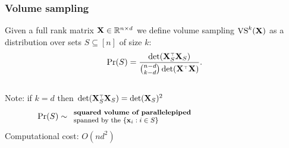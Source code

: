 \documentclass{beamer}
\begin{document}
\begin{frame}
  \frametitle{Volume sampling}
\begin{definition}[[AB13{]}]
  \label{d:vs}
  Given a  full rank matrix  $\mathbf X\in\mathbb R^{n\times d}$ we define volume sampling
  ${\mathrm{VS}}^k(\mathbf X)$ as a distribution over sets $S\subseteq [n]$ of size $k$:
  \begin{align*}
    \Pr(S) =
    \frac{\det(\X_S^\top\X_S)}{{n-d\choose k-d}\det(\X^\top\X)}.
  \end{align*}
\end{definition}
\vspace{5mm}
\pause
\begin{columns}
  \begin{column}{0.5\textwidth}
    Note: if $k=d$ then $\det(\X_S^\top\X_S)=\det(\X_S)^2$
$$
\mathrm{Pr}(S)\sim {\footnotesize
\begin{array}{l}
\text{\bf squared volume of parallelepiped} \\
\text{spanned by the $\{\mathbf x_i:i\in S\}$}
\end{array}
         }
$$
{\footnotesize Computational cost: $O(nd^2)$}
\end{column}
\begin{column}{.3\textwidth}
\end{column}
\end{columns}
\end{frame}
\end{document}
